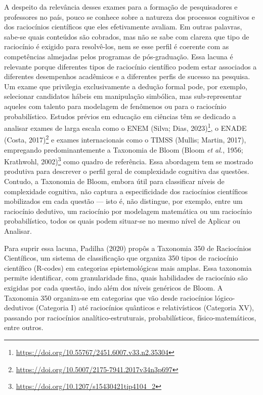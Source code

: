\documentclass[
  12pt,
  a4paper,
  twoside,
  brazilian
]{article}
\begin{document}
A despeito da relevância desses exames para a formação de pesquisadores
e professores no país, pouco se conhece sobre a natureza dos processos
cognitivos e dos raciocínios científicos que eles efetivamente avaliam.
Em outras palavras, sabe-se quais conteúdos são cobrados, mas não se
sabe com clareza que tipo de raciocínio é exigido para resolvê-los, nem
se esse perfil é coerente com as competências almejadas pelos programas
de pós-graduação. Essa lacuna é relevante porque diferentes tipos de
raciocínio científico podem estar associados a diferentes desempenhos
acadêmicos e a diferentes perfis de sucesso na pesquisa. Um exame que
privilegia exclusivamente a dedução formal pode, por exemplo, selecionar
candidatos hábeis em manipulação simbólica, mas sub-representar aqueles
com talento para modelagem de fenômenos ou para o raciocínio
probabilístico. Estudos prévios em educação em ciências têm se dedicado
a analisar exames de larga escala como o ENEM (Silva; Dias, 2023)\footnote{\url{https://doi.org/10.55767/2451.6007.v33.n2.35304}}, o
ENADE (Costa, 2017)\footnote{\url{https://doi.org/10.5007/2175-7941.2017v34n3p697}} e exames internacionais como o TIMSS (Mullis;
Martin, 2017), empregando predominantemente a Taxonomia de Bloom (Bloom
\textit{et al.}, 1956; Krathwohl, 2002)\footnote{\url{https://doi.org/10.1207/s15430421tip4104_2}} como quadro de referência. Essa abordagem
tem se mostrado produtiva para descrever o perfil geral de complexidade
cognitiva das questões. Contudo, a Taxonomia de Bloom, embora útil para
classificar níveis de complexidade cognitiva, não captura a
especificidade dos raciocínios científicos mobilizados em cada questão
--- isto é, não distingue, por exemplo, entre um raciocínio dedutivo, um
raciocínio por modelagem matemática ou um raciocínio probabilístico,
todos os quais podem situar-se no mesmo nível de Aplicar ou Analisar.

Para suprir essa lacuna, Padilha (2020) propôs a Taxonomia 350 de
Raciocínios Científicos, um sistema de classificação que organiza 350
tipos de raciocínio científico (R-codes) em categorias epistemológicas
mais amplas. Essa taxonomia permite identificar, com granularidade fina,
quais habilidades de raciocínio são exigidas por cada questão, indo além
dos níveis genéricos de Bloom. A Taxonomia 350 organiza-se em categorias
que vão desde raciocínios lógico-dedutivos (Categoria I) até raciocínios
quânticos e relativísticos (Categoria XV), passando por raciocínios
analítico-estruturais, probabilísticos, físico-matemáticos, entre
outros.
\end{document}
